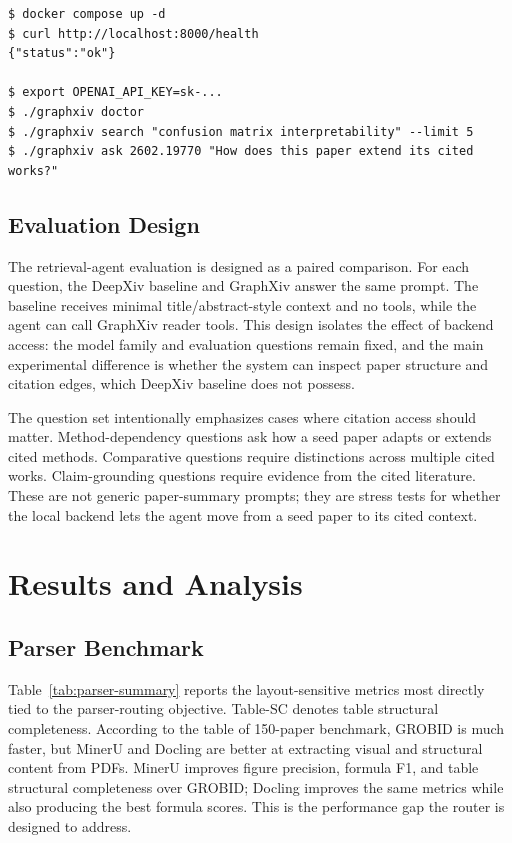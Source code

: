 \documentclass[10pt]{article}
\begin{document}
\begin{lstlisting}[style=terminal,caption={Minimal terminal setup for live local testing.}]
$ docker compose up -d
$ curl http://localhost:8000/health
{"status":"ok"}

$ export OPENAI_API_KEY=sk-...
$ ./graphxiv doctor
$ ./graphxiv search "confusion matrix interpretability" --limit 5
$ ./graphxiv ask 2602.19770 "How does this paper extend its cited works?"
\end{lstlisting}


\subsection{Evaluation Design}

The retrieval-agent evaluation is designed as a paired comparison. For each question, the DeepXiv baseline and GraphXiv answer the same prompt. The baseline receives minimal title/abstract-style context and no tools, while the agent can call GraphXiv reader tools. This design isolates the effect of backend access: the model family and evaluation questions remain fixed, and the main experimental difference is whether the system can inspect paper structure and citation edges, which DeepXiv baseline does not possess.

The question set intentionally emphasizes cases where citation access should matter. Method-dependency questions ask how a seed paper adapts or extends cited methods. Comparative questions require distinctions across multiple cited works. Claim-grounding questions require evidence from the cited literature. These are not generic paper-summary prompts; they are stress tests for whether the local backend lets the agent move from a seed paper to its cited context.

\section{Results and Analysis}

\subsection{Parser Benchmark}

Table~\ref{tab:parser-summary} reports the layout-sensitive metrics most directly tied to the parser-routing objective. Table-SC denotes table structural completeness. According to the table of 150-paper benchmark, GROBID is much faster, but MinerU and Docling are better at extracting visual and structural content from PDFs. MinerU improves figure precision, formula F1, and table structural completeness over GROBID; Docling improves the same metrics while also producing the best formula scores. This is the performance gap the router is designed to address.
\end{document}
